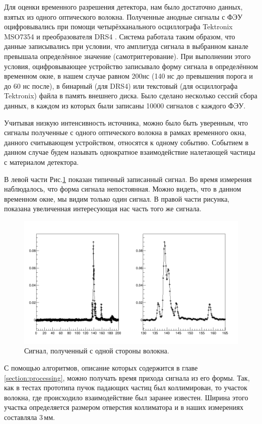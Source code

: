 Для оценки временного разрешения детектора, нам было достаточно данных, взятых из одного оптического волокна. 
Полученные анодные сигналы с ФЭУ оцифровывались при помощи четырёхканального осциллографа Tektronix MSO7354 \cite{tektronix} и преобразователя DRS4 \cite{plata}.
Система работала таким образом, что данные записывались при условии, что амплитуда сигнала в выбранном канале превышала определённое значение (самотриггерование).
При выполнении этого условия, оцифровывающее устройство записывало форму сигнала в определённом временном окне, в нашем случае равном 200нс (140 нс до превышения порога и до 60 нс после), в бинарный (для DRS4) или текстовый (для осциллографа Tektronix) файла в память внешнего диска. 
Было сделано несколько сессий сбора данных, в каждом из которых были записаны 10000 сигналов с каждого ФЭУ.


Учитывая низкую интенсивность источника, можно было быть уверенным, что сигналы полученные с одного оптического волокна в рамках временного окна, данного считывающем устройством, относятся к одному событию.
Событием в данном случае будем называть однократное взаимодействие налетающей частицы с материалом детектора.

В левой части Рис.\ref{ris:signal1} показан типичный записанный сигнал. Во время измерения наблюдалось, что форма сигнала непостоянная. Можно видеть, что в данном временном окне, мы видим только один сигнал. В правой части рисунка, показана увеличенная интересующая нас часть того же сигнала.
\begin{figure}
	\centering
	\includegraphics[width=1\linewidth]{signal1.png}
	\caption{Сигнал, полученный с одной стороны волокна.}\label{ris:signal1}
\end{figure}

С помощью алгоритмов, описание которых содержится в главе \ref{section:processing}, можно получать время прихода сигнала из его формы. 
Так, как в тестах прототипа пучок падающих частиц был коллимирован, то участок волокна, где происходило взаимодействие был заранее известен.
Ширина этого участка определяется размером отверстия коллиматора и в наших измерениях составляла 3\,мм.



